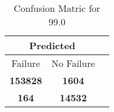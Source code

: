 \begin{table}[] 
\caption{Confusion Matric for 99.0} 
\label{Table: Prediction Accuracy-None99.0RandomForest100EKF-ignoreReflection-Reflection} 
\centering 
\begin{tabular} 
 {@{}ccc@{}} 
\toprule 
\multicolumn{2}{c}{\textbf{Predicted}}
 \\ \midrule 
\multicolumn{1}{|c|}{Failure} & 
\multicolumn{1}{c|}{No Failure}
 \\ \midrule 
\multicolumn{1}{|c|}{\color{green}\textbf{153828}} & 
\multicolumn{1}{c|}{\color{red}\textbf{1604}}
 \\ \midrule 
\multicolumn{1}{|c|}{\color{red}\textbf{164}} & 
\multicolumn{1}{c|}{\color{green}\textbf{14532}}
 \\ \bottomrule 
\end{tabular} 
\end{table} 
